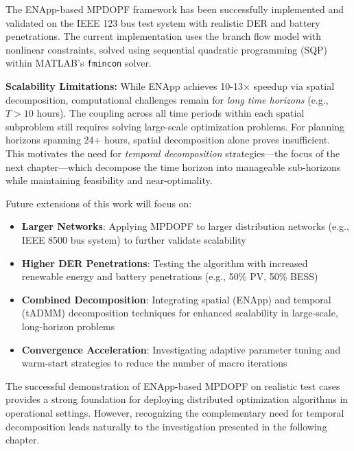 The ENApp-based MPDOPF framework has been successfully implemented and validated on the IEEE 123 bus test system with realistic DER and battery penetrations. The current implementation uses the branch flow model with nonlinear constraints, solved using sequential quadratic programming (SQP) within MATLAB's \texttt{fmincon} solver.

\textbf{Scalability Limitations:} While ENApp achieves 10-13× speedup via spatial decomposition, computational challenges remain for \textit{long time horizons} (e.g., $T > 10$ hours). The coupling across all time periods within each spatial subproblem still requires solving large-scale optimization problems. For planning horizons spanning 24+ hours, spatial decomposition alone proves insufficient. This motivates the need for \textit{temporal decomposition} strategies—the focus of the next chapter—which decompose the time horizon into manageable sub-horizons while maintaining feasibility and near-optimality.

Future extensions of this work will focus on:

\begin{itemize}
    \item \textbf{Larger Networks}: Applying MPDOPF to larger distribution networks (e.g., IEEE 8500 bus system) to further validate scalability
    \item \textbf{Higher DER Penetrations}: Testing the algorithm with increased renewable energy and battery penetrations (e.g., 50\% PV, 50\% BESS)
    \item \textbf{Combined Decomposition}: Integrating spatial (ENApp) and temporal (tADMM) decomposition techniques for enhanced scalability in large-scale, long-horizon problems
    \item \textbf{Convergence Acceleration}: Investigating adaptive parameter tuning and warm-start strategies to reduce the number of macro iterations
\end{itemize}

The successful demonstration of ENApp-based MPDOPF on realistic test cases provides a strong foundation for deploying distributed optimization algorithms in operational settings. However, recognizing the complementary need for temporal decomposition leads naturally to the investigation presented in the following chapter.
